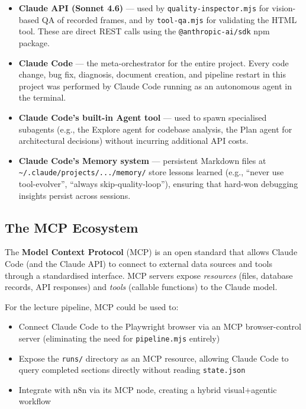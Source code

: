 \documentclass[12pt,a4paper]{article}
\begin{document}
\begin{itemize}[leftmargin=2em]
  \item \textbf{Claude API (Sonnet 4.6)} --- used by \texttt{quality-inspector.mjs}
        for vision-based QA of recorded frames, and by \texttt{tool-qa.mjs} for
        validating the HTML tool. These are direct REST calls using the
        \texttt{@anthropic-ai/sdk} npm package.
  \item \textbf{Claude Code} --- the meta-orchestrator for the entire project.
        Every code change, bug fix, diagnosis, document creation, and pipeline
        restart in this project was performed by Claude Code running as an
        autonomous agent in the terminal.
  \item \textbf{Claude Code's built-in Agent tool} --- used to spawn specialised
        subagents (e.g., the Explore agent for codebase analysis, the Plan agent
        for architectural decisions) without incurring additional API costs.
  \item \textbf{Claude Code's Memory system} --- persistent Markdown files
        at \texttt{\textasciitilde/.claude/projects/.../memory/} store lessons
        learned (e.g., ``never use tool-evolver'', ``always skip-quality-loop''),
        ensuring that hard-won debugging insights persist across sessions.
\end{itemize}

\subsection{The MCP Ecosystem}

The \textbf{Model Context Protocol} (MCP) is an open standard that allows
Claude Code (and the Claude API) to connect to external data sources and tools
through a standardised interface. MCP servers expose \emph{resources} (files,
database records, API responses) and \emph{tools} (callable functions) to the
Claude model.

For the lecture pipeline, MCP could be used to:
\begin{itemize}[leftmargin=2em]
  \item Connect Claude Code to the Playwright browser via an MCP browser-control
        server (eliminating the need for \texttt{pipeline.mjs} entirely)
  \item Expose the \texttt{runs/} directory as an MCP resource, allowing Claude
        Code to query completed sections directly without reading \texttt{state.json}
  \item Integrate with n8n via its MCP node, creating a hybrid visual+agentic
        workflow
\end{itemize}
\end{document}
